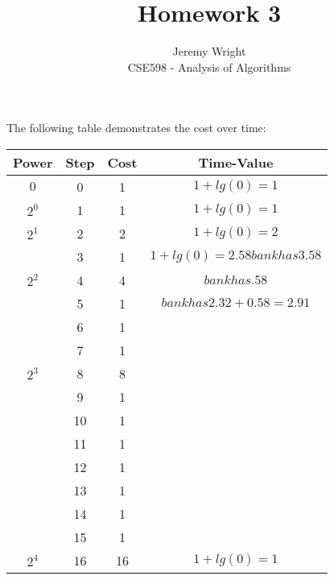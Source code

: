 \documentclass[12pt]{article}
\newenvironment{problem}[2][Problem]{\begin{trivlist}
\item[\hskip \labelsep {\bfseries #1}\hskip \labelsep {\bfseries #2.}]}{\end{trivlist}}
\begin{document}
 
 
\title{Homework 3}%
\author{Jeremy Wright\\ %
CSE598 - Analysis of Algorithms} %
 
\maketitle
\begin{problem}{1}
    The following table demonstrates the cost over time:
\\
    \begin{tabular}{|c | c | c | c |}\hline
        Power & Step & Cost & Time-Value\\ \hline
        $0$   & 0    & 1    & $1 + lg(0) = 1$ \\ \hline
        $2^0$ & 1    & 1    & $1 + lg(0) = 1$ \\ \hline
        $2^1$ & 2    & 2    & $1 + lg(0) = 2$ \\ \hline
            & 3    & 1    & $1 + lg(0) = 2.58 bank has 3.58$ \\ \hline
        $2^2$ & 4    & 4    & $ bank has .58$ \\ \hline
            & 5    & 1    & $ bank has 2.32 + 0.58 = 2.91$ \\ \hline
            & 6    & 1    &  \\ \hline
            & 7    & 1    &  \\ \hline
        $2^3$ & 8    & 8    &  \\ \hline
            & 9    & 1    &  \\ \hline
            & 10   & 1    &  \\ \hline
            & 11   & 1    &  \\ \hline
            & 12   & 1    &  \\ \hline
            & 13   & 1    &  \\ \hline
            & 14   & 1    &  \\ \hline
            & 15   & 1    &  \\ \hline
        $2^4$ & 16   & 16    & $1 + lg(0) = 1$ \\ \hline
    \end{tabular}


\end{problem}
\end{document}
